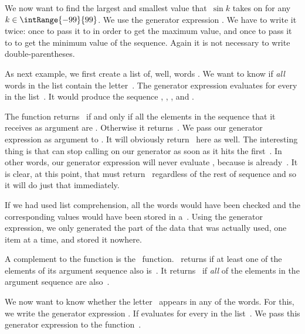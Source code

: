 We now want to find the largest and smallest value that~$\sin{k}$ takes on for any~$k\in\intRange{-99}{99}$.
We use the generator expression .
We have to write it twice:
once to pass it to  in order to get the maximum value, and once to pass it to  to get the minimum value of the sequence.
Again it is not necessary to write double-parentheses.%
%
\begin{sloppypar}%
As next example, we first create a list  of, well, words .
We want to know if \emph{all} words in the list contain the letter~.
The generator expression  evaluates  for every  in the list~.
It would produce the sequence , , , and .%
\end{sloppypar}%
%
The function  returns~ if and only if all the elements in the sequence that it receives as argument are .
Otherwise it returns~.
We pass our generator expression as argument to .
It will obviously return~ here as well.
The interesting thing is that  can stop calling  on our generator as soon as it hits the first~.
In other words, our generator expression will never evaluate , because  is already~.
It is clear, at this point, that  must return~ regardless of the rest of sequence and so it will do just that immediately.

If we had used list comprehension, all the words would have been checked and the corresponding  values would have been stored in a~.
Using the generator expression, we only generated the part of the data that was actually used, one item at a time, and stored it nowhere.

A complement to the  function is the ~function.
~returns  if at least one of the elements of its argument sequence also is~.
It returns~ if \emph{all} of the elements in the argument sequence are also~.

We now want to know whether the letter~ appears in any of the words.
For this, we write the generator expression .
If evaluates  for every  in the list~.
We pass this generator expression to the function~.

